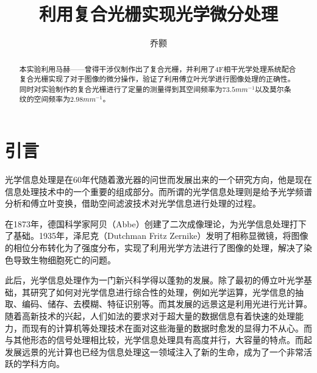 \documentclass[aps,pre,12pt,preprint,onecolumn,showpacs,showkeys,UTF8]{revtex4-1}
\begin{document}
\title{\bf\heiti{}利用复合光栅实现光学微分处理\vspace{15mm}}
\author{\fangsong 乔颢\vspace{2mm}}
\begin{abstract}
	\vspace{10mm}
	\begin{spacing}{1.5}
		\songti{}
		本实验利用马赫——曾得干涉仪制作出了复合光栅，并利用了4F相干光学处理系统配合复合光栅实现了对于图像的微分操作，验证了利用傅立叶光学进行图像处理的正确性。同时对实验制作的复合光栅进行了定量的测量得到其空间频率为$73.5mm^{-1}$以及莫尔条纹的空间频率为$2.98mm^{-1}$。
	\end{spacing}
\end{abstract}

\maketitle

\section{引言}

光学信息处理是在60年代随着激光器的问世而发展出来的一个研究方向，他是现在信息处理技术中的一个重要的组成部分。而所谓的光学信息处理则是给予光学频谱分析和傅立叶变换，借助空间滤波技术对光学信息进行处理的过程。

在1873年，德国科学家阿贝（Abbe）创建了二次成像理论，为光学信息处理打下了基础。1935年，泽尼克（Dutchman Fritz Zernike）发明了相称显微镜，将图像的相位分布转化为了强度分布，实现了利用光学方法进行了图像的处理，解决了染色导致生物细胞死亡的问题。

此后，光学信息处理作为一门新兴科学得以蓬勃的发展。除了最初的傅立叶光学基础，其研究了如何对光学信息进行综合性的处理，例如光学运算，光学信息的抽取、编码、储存、去模糊、特征识别等。而其发展的远景这是利用光进行光计算。随着高新技术的兴起，人们如法的要求对于超大量的数据信息有着快速的处理能力，而现有的计算机等处理技术在面对这些海量的数据时愈发的显得力不从心。而与其他形态的信号处理相比较，光学信息处理具有高度并行，大容量的特点。\cite{Book2}而起发展远景的光计算也已经为信息处理这一领域注入了新的生命，成为了一个非常活跃的学科方向。
\end{document}

